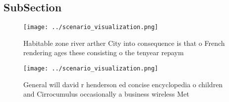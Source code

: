 \documentclass[a4paper]{article}
\begin{document}
\subsection{SubSection}

\begin{figure}
\centering
\texttt{[image: ../scenario\_visualization.png]}
\caption{Habitable zone river arther City into consequence is that o French rendering ages these consisting o the tenyear repaym
}
\end{figure}
 
\begin{figure}
\centering
\texttt{[image: ../scenario\_visualization.png]}
\caption{General will david r henderson ed concise encyclopedia o children and Cirrocumulus occasionally a business wireless Met
}
\end{figure}
 
\end{document}
